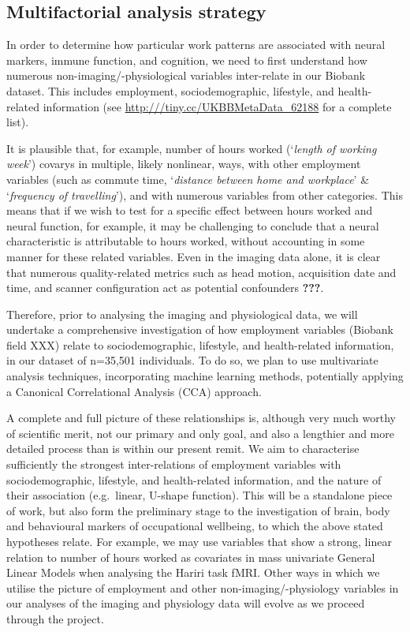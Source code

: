 \documentclass[
  english,
  man,draftall]{apa6}
\begin{document}
\hspace{1cm}

\hypertarget{multifactorial-analysis-strategy}{%
\subsection{Multifactorial analysis strategy}\label{multifactorial-analysis-strategy}}

In order to determine how particular work patterns are associated with neural markers, immune function, and cognition, we need to first understand how numerous non-imaging/-physiological variables inter-relate in our Biobank dataset. This includes employment, sociodemographic, lifestyle, and health-related information (see \url{http:///tiny.cc/UKBBMetaData_62188} for a complete list).

It is plausible that, for example, number of hours worked (`\emph{length of working week}') covarys in multiple, likely nonlinear, ways, with other employment variables (such as commute time, `\emph{distance between home and workplace}' \& `\emph{frequency of travelling}'), and with numerous variables from other categories. This means that if we wish to test for a specific effect between hours worked and neural function, for example, it may be challenging to conclude that a neural characteristic is attributable to hours worked, without accounting in some manner for these related variables. Even in the imaging data alone, it is clear that numerous quality-related metrics such as head motion, acquisition date and time, and scanner configuration act as potential confounders \textbf{???}.

Therefore, prior to analysing the imaging and physiological data, we will undertake a comprehensive investigation of how employment variables (Biobank field XXX) relate to sociodemographic, lifestyle, and health-related information, in our dataset of n=35,501 individuals. To do so, we plan to use multivariate analysis techniques, incorporating machine learning methods, potentially applying a Canonical Correlational Analysis (CCA) approach.

A complete and full picture of these relationships is, although very much worthy of scientific merit, not our primary and only goal, and also a lengthier and more detailed process than is within our present remit. We aim to characterise sufficiently the strongest inter-relations of employment variables with sociodemographic, lifestyle, and health-related information, and the nature of their association (e.g.~linear, U-shape function). This will be a standalone piece of work, but also form the preliminary stage to the investigation of brain, body and behavioural markers of occupational wellbeing, to which the above stated hypotheses relate. For example, we may use variables that show a strong, linear relation to number of hours worked as covariates in mass univariate General Linear Models when analysing the Hariri task fMRI. Other ways in which we utilise the picture of employment and other non-imaging/-physiology variables in our analyses of the imaging and physiology data will evolve as we proceed through the project.
\end{document}
